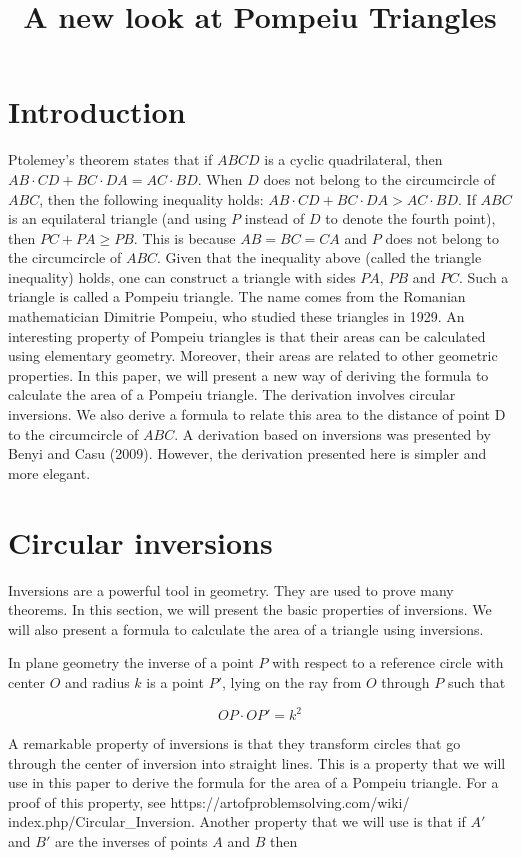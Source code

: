 \documentclass[12pt]{article}
\title{A new look at Pompeiu Triangles}
\begin{document}
\maketitle
\section{Introduction}
Ptolemey's theorem states that if $ABCD$ is a cyclic quadrilateral, then $AB\cdot CD+BC\cdot DA=AC\cdot BD$. When $D$ does not belong to the circumcircle of $ABC$, then the following inequality holds: $AB\cdot CD+BC\cdot DA>AC\cdot BD$. If $ABC$ is an equilateral triangle (and using $P$ instead of $D$ to denote the fourth point), then $PC+PA \geq PB$. This is because $AB=BC=CA$ and $P$ does not belong to the circumcircle of $ABC$. Given that the inequality above (called the triangle inequality) holds, one can construct a triangle with sides $PA$, $PB$ and $PC$.  Such a triangle is called a Pompeiu triangle. The name comes from the Romanian mathematician Dimitrie Pompeiu, who studied these triangles in 1929. An interesting property of Pompeiu triangles is that their areas can be calculated using elementary geometry. Moreover, their areas are related to other geometric properties. In this paper, we will present a new way of deriving the formula to 
calculate the area of a Pompeiu triangle. The derivation involves circular inversions. We also derive a formula to relate this area to the distance of point D to the circumcircle of $ABC$. A derivation based on inversions was presented by Benyi and Casu (2009). However, the derivation presented here is simpler and more elegant. 

\section{Circular inversions}
Inversions are a powerful tool in geometry. They are used to prove many theorems. In this section, we will present the basic properties of inversions. We will also present a formula to calculate the area of a triangle using inversions.

In plane geometry the inverse of a point $P$ with respect to a reference circle with center $O$ and radius $k$ is a point $P'$, lying on the ray from $O$ through $P$ such that

\begin{equation}
OP\cdot OP'=k^2
\label{eq:inversion}
\end{equation}

A remarkable property of inversions is that they transform circles that go through the center of inversion into straight lines. This is a property that we will use in this paper to derive the formula for the area of a Pompeiu triangle. For a proof of this property, see https://artofproblemsolving.com/wiki/
index.php/Circular\_Inversion.
Another property that we will use is that if $A'$ and $B'$ are the inverses of points $A$ and $B$ then 
\end{document}
